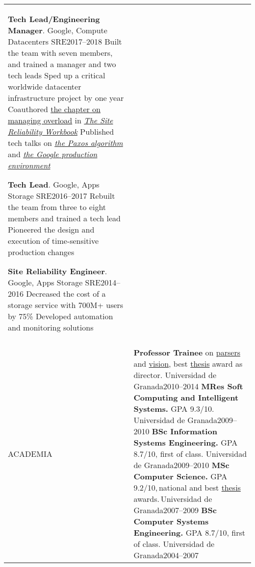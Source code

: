 \documentclass[letterpaper,10pt,oneside]{article}
\newcommand{\DatestampY}[1]{#1}
\newenvironment{body}
{\par\par
\begin{longtable}{p{0.125\textwidth}p{0.84\textwidth}}}
{\par\end{longtable}\par}
\renewcommand{\section}[3]{\\[-0.7cm]\pdfbookmark[2]{#2}{#3}\\%
\raggedleft  %
{\fontsize{9.5pt}{9.5pt}\selectfont\bfseries\raggedright%
\MakeUppercase{#1}}&}
\newcommand{\SmallEntryGap}{\par\vspace{0.38em}\par}
\begin{document}
\begin{body}
\textbf{Tech Lead/Engineering Manager}. Google, Compute Datacenters SRE\hfill \DatestampY{2017}--\DatestampY{2018} \newline
\phantom{w}Built the team with seven members, and trained a manager and two tech leads\newline
\phantom{w}Sped up a critical worldwide datacenter infrastructure project by one year\newline
\phantom{w}Coauthored \href{https://landing.google.com/sre/workbook/chapters/overload/}{the chapter on managing overload} in \textit{\href{https://landing.google.com/sre/books/}{The Site Reliability Workbook}}\newline
\phantom{w}Published tech talks on \textit{\href{https://youtu.be/d7nAGI_NZPk}{the Paxos algorithm}} and \textit{\href{https://youtu.be/dhTVVWzpc4Q}{the Google production environment}}

\SmallEntryGap

\textbf{Tech Lead}. Google, Apps Storage SRE\hfill \DatestampY{2016}--\DatestampY{2017}\newline
\phantom{w}Rebuilt the team from three to eight members and trained a tech lead\newline
\phantom{w}Pioneered the design and execution of time-sensitive production changes

\SmallEntryGap

\textbf{Site Reliability Engineer}. Google, Apps Storage SRE\hfill \DatestampY{2014}--\DatestampY{2016}\newline
\phantom{w}Decreased the cost of a storage service with 700M+ users by 75\%\newline
\phantom{w}Developed automation and monitoring solutions


\section{Academia}{Academia}{PDF:Academia}

\textbf{Professor Trainee} on \href{https://github.com/lquesada/ModelCC}{parsers} and \href{https://github.com/lquesada/MotionTracking}{vision}, best \href{https://github.com/lquesada/ADAgio}{thesis} award as director. Universidad de Granada\hfill \DatestampY{2010}--\DatestampY{2014} \newline
\textbf{MRes Soft Computing and Intelligent Systems.} GPA 9.3/10. Universidad de Granada\hfill \DatestampY{2009}--\DatestampY{2010} \newline
\textbf{BSc Information Systems Engineering.} GPA 8.7/10, first of class. Universidad de Granada\hfill \DatestampY{2009}--\DatestampY{2010} \newline
\textbf{MSc Computer Science.} GPA\,9.2/10,\,national and best \href{https://github.com/lquesada/JSimil}{thesis} awards.\,Universidad de Granada\hfill \DatestampY{2007}--\DatestampY{2009} \newline
\textbf{BSc Computer Systems Engineering.} GPA 8.7/10, first of class. Universidad de Granada\hfill \DatestampY{2004}--\DatestampY{2007}


\end{body}
\end{document}
